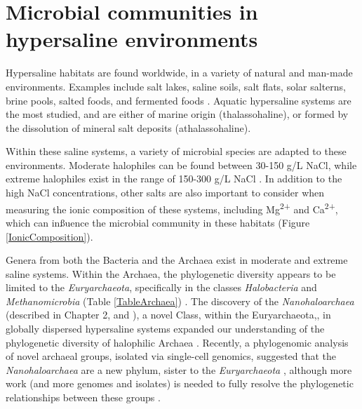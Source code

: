 
\section{Microbial communities in hypersaline environments}

Hypersaline habitats are found worldwide, in a variety of natural and man-made environments. Examples include salt lakes, saline soils, salt ﬂats, solar salterns, brine pools, salted foods, and fermented foods \cite{Oren:2002vw}. Aquatic hypersaline systems are the most studied, and are either of marine origin (thalassohaline), or formed by the dissolution of mineral salt deposits (athalassohaline). 

Within these saline systems, a variety of microbial species are adapted to these environments. Moderate halophiles can be found between 30-150 g/L NaCl, while extreme halophiles exist in the range of 150-300 g/L NaCl  \cite{Andrei:2012he}. In addition to the high NaCl concentrations, other salts are also important to consider when measuring the ionic composition of these systems, including Mg\textsuperscript{2+} and Ca\textsuperscript{2+}, which can inßuence the microbial community in these habitats  \cite{McGenity:2000ts,Podell:2013fp} (Figure \ref{IonicComposition}).

Genera from both the Bacteria and the Archaea exist in moderate and extreme saline systems. Within the Archaea, the phylogenetic diversity appears to be limited to the \textit{Euryarchaeota}, specifically in the classes \textit{Halobacteria} and \textit{Methanomicrobia} (Table \ref{TableArchaea}) \cite{Ventosa:2012wo}. The discovery of the \textit{Nanohaloarchaea} (described in Chapter 2, and \cite{Narasingarao:2012kp}), a novel Class, within the Euryarchaeota,, in globally dispersed hypersaline systems expanded our understanding of the phylogenetic diversity of halophilic Archaea \cite{Narasingarao:2012kp}. Recently, a phylogenomic analysis of novel archaeal groups, isolated via single-cell genomics, suggested that the \textit{Nanohaloarchaea} are a new phylum, sister to the \textit{Euryarchaeota} \cite{Rinke:2013bt}, although more work (and more genomes and isolates) is needed to fully resolve the phylogenetic relationships between these groups \cite{Williams:um}.

